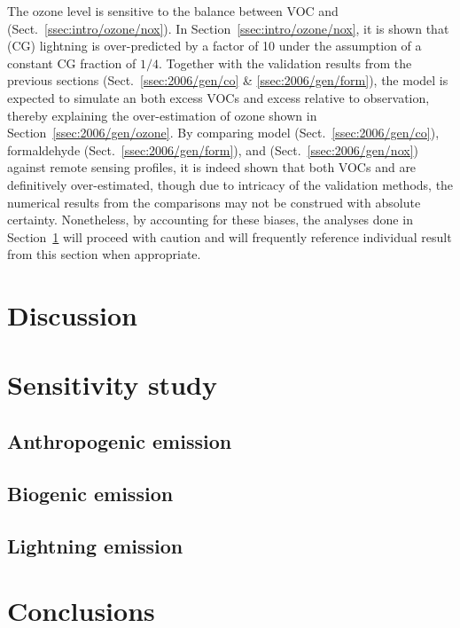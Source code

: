 \noindent The ozone level is sensitive to the balance between VOC and  (Sect.~\ref{ssec:intro/ozone/nox}). In
Section~\ref{ssec:intro/ozone/nox}, it is shown that (CG) lightning is over-predicted by a factor of 10 under the assumption of a constant
CG fraction of $1/4$. Together with the validation results from the previous sections (Sect.~\ref{ssec:2006/gen/co} \& \ref{ssec:2006/gen/form}),
the model is expected to simulate an both excess VOCs and excess  relative to observation, thereby explaining the
over-estimation of ozone shown in Section~\ref{ssec:2006/gen/ozone}. By comparing model  (Sect.~\ref{ssec:2006/gen/co}),
formaldehyde (Sect.~\ref{ssec:2006/gen/form}), and  (Sect.~\ref{ssec:2006/gen/nox}) against remote sensing profiles, it is
indeed shown that both VOCs and  are definitively over-estimated, though due to intricacy of the validation methods, the
numerical results from the comparisons may not be construed with absolute certainty. Nonetheless,  by accounting for these biases, the
analyses done in Section~\ref{sec:2006/discussion} will proceed with caution and will frequently reference individual result from this
section when appropriate.

\section{Discussion}\label{sec:2006/discussion}

\section{Sensitivity study}\label{sec:2006/sens}
\subsection{Anthropogenic emission}\label{ssec:2006/sens/anthrop}
\subsection{Biogenic emission}\label{ssec:2006/sens/bio}
\subsection{Lightning emission}\label{ssec:2006/sens/lnox}

\section{Conclusions}\label{sec:2006/conslusion}
